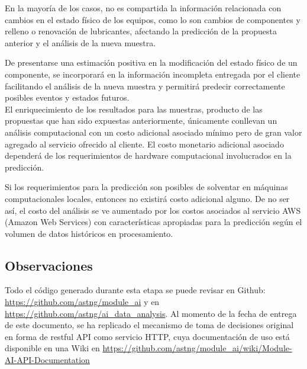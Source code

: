 \documentclass{article}
\begin{document}
En la mayoría de los casos, no es compartida la información relacionada con cambios en el estado físico de los equipos, como lo son cambios de componentes y relleno o renovación de lubricantes, afectando la predicción de la propuesta anterior y el análisis de la nueva muestra.

De presentarse una estimación positiva en la modificación del estado físico de un componente, se incorporará en la información incompleta entregada por el cliente facilitando el análisis de la nueva muestra y permitirá predecir correctamente posibles eventos y estados futuros.
\\
El enriquecimiento de los resultados para las muestras, producto de las propuestas que han sido expuestas anteriormente, únicamente conllevan un análisis computacional con un costo adicional asociado mínimo pero de gran valor agregado al servicio ofrecido al cliente. El costo monetario adicional asociado dependerá de los requerimientos de hardware computacional involucrados en la predicción. 

Si los requerimientos para la predicción son posibles de solventar en máquinas computacionales locales, entonces no existirá costo adicional alguno. De no ser así, el costo del análisis se ve aumentado por los costos asociados al servicio AWS (Amazon Web Services) con características apropiadas para la predicción según el volumen de datos históricos en procesamiento.

\subsection{Observaciones}
Todo el código generado durante esta etapa se puede revisar en Github: \url{https://github.com/astng/module_ai} y en \url{https://github.com/astng/ai_data_analysis}. Al momento de la fecha de entrega de este documento, se ha replicado el mecanismo de toma de decisiones original en forma de restful API como servicio HTTP, cuya documentaci\'on de uso est\'a disponible en una Wiki en \url{https://github.com/astng/module_ai/wiki/Module-AI-API-Documentation}




%
%
\end{document}
